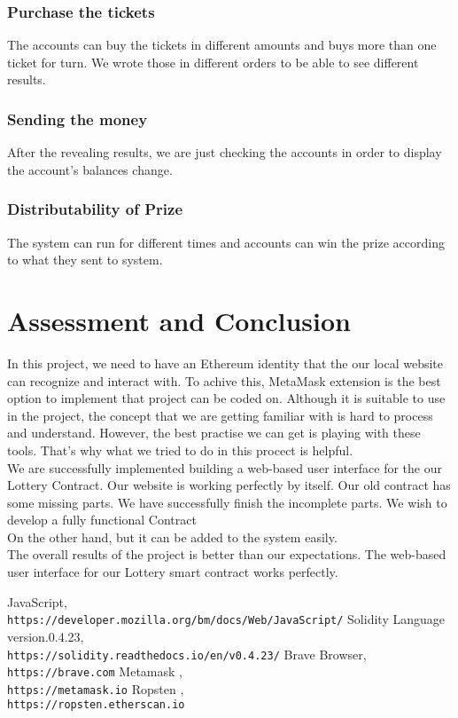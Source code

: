 \documentclass[]{scrreprt}
\begin{document}
			\subsection{Purchase the tickets}
			The accounts can buy the tickets in different amounts and buys more than one ticket for turn. We wrote  those in different orders to be able to see different results. 
			\subsection{Sending the money}
			After the revealing results, we are just checking the accounts in order to display the account's balances change. 
			\subsection{Distributability of Prize}
			The system can run for different times and accounts can win the prize according to what they sent to system.
			
\chapter{Assessment and Conclusion}
In this project, we need to have an Ethereum identity that the our local website can recognize and interact with. To achive this,  MetaMask extension is the best option to implement that project can be coded on. Although it is suitable to use in the project, the concept that we are getting familiar with is hard to process and understand. However, the best practise we can get is playing with these tools. That's why what we tried to do in this procect is helpful.\\
We are successfully implemented building a web-based user interface for the our Lottery Contract. Our website is working perfectly by itself. Our old contract has some missing parts. We have successfully finish the incomplete parts. We wish to develop a fully functional Contract \\
On the other hand, but it can be added to the system easily.\\
The overall results of the project is better than our expectations. The web-based user interface for our Lottery smart contract works perfectly.


\begin{appendices}


\end{appendices}

\begin{thebibliography}{9}

		JavaScript,
		\\\texttt{https://developer.mozilla.org/bm/docs/Web/JavaScript/}
		Solidity Language version.0.4.23,
		\\\texttt{https://solidity.readthedocs.io/en/v0.4.23/}
		Brave Browser,
		\\\texttt{https://brave.com}
		Metamask ,
		\\\texttt{https://metamask.io}
			Ropsten , 
			\\\texttt{https://ropsten.etherscan.io}
		
\end{thebibliography}
\end{document}
